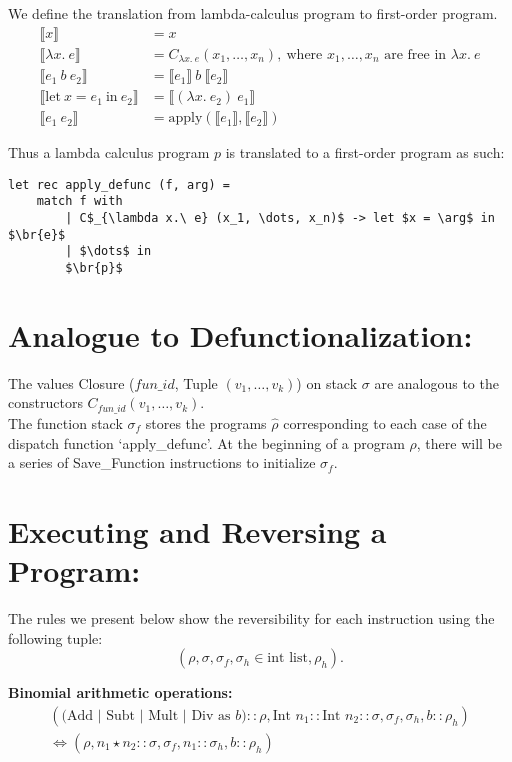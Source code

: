 \documentclass[11pt]{article}
\newcommand*{\br}[1]{\llbracket{#1}\rrbracket}
\begin{document}
We define the translation from lambda-calculus program to first-order program.
\begin{align*}
        \br{x} &= x\\
            \br{\lambda x.\ e} &= C_{\lambda x.\ e} (x_1, \dots, x_n),\ \text{where $x_1, \dots, x_n$ are free in $\lambda x.\ e$}\\
                \br{e_1\ b\ e_2} &= \br{e_1}\ b\ \br{e_2}\\
                    \br{\text{let}\ x = e_1\ \text{in}\ e_2} &= \br{(\lambda x.\ e_2)\ e_1}\\
                        \br{e_1\ e_2} &= \text{apply}(\br{e_1}, \br{e_2})
\end{align*}

Thus a lambda calculus program $p$ is translated to a first-order program as such:
\begin{lstlisting}[mathescape = true]
let rec apply_defunc (f, arg) = 
    match f with
        | C$_{\lambda x.\ e} (x_1, \dots, x_n)$ -> let $x = \arg$ in $\br{e}$
        | $\dots$ in
        $\br{p}$
\end{lstlisting}

\section*{Analogue to Defunctionalization:}

The values Closure ($fun\_id$, Tuple $(v_1, \dots, v_k)$) on stack $\sigma$ are analogous to the constructors $C_{fun\_id} (v_1, \dots, v_k)$.\\

The function stack $\sigma_f$ stores the programs $\hat{\rho}$ corresponding to each case of the dispatch function `apply\_defunc'. At the beginning of a program $\rho$, there will be a series of Save\_Function instructions to initialize $\sigma_f$.

\break{}

\section*{Executing and Reversing a Program:}

The rules we present below show the reversibility for each instruction using the following tuple: $$(\rho, \sigma, \sigma_f, \sigma_h \in \text{int list}, \rho_h).$$

\textbf{Binomial arithmetic operations:}
\begin{gather*}
    (\text{(Add $|$ Subt $|$ Mult $|$ Div as $b$)}::\rho, \text{Int $n_1$}::\text{Int $n_2$}::\sigma, \sigma_f, \sigma_h, b::\rho_h)\\
    \Longleftrightarrow (\rho, n_1 \star n_2::\sigma, \sigma_f, n_1::\sigma_h, b::\rho_h)
\end{gather*}
\end{document}
